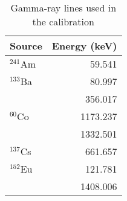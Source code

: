 \begin{table}
\renewcommand{\arraystretch}{1.3}
\caption{Gamma-ray lines used in the calibration \cite{lund}}
\label{tab:src}
\centering
\begin{tabular}{l|r}
\hline
\bfseries Source & \bfseries Energy (keV)\\
\hline\hline
      $^{241}$Am    &  59.541    \\
      $^{133}$Ba    &  80.997    \\
                    &  356.017   \\
      $^{60}$Co     &  1173.237  \\
                    &  1332.501  \\
      $^{137}$Cs    &  661.657   \\
      $^{152}$Eu    &  121.781   \\
                    &  1408.006  \\
\hline
\end{tabular}
\end{table}
